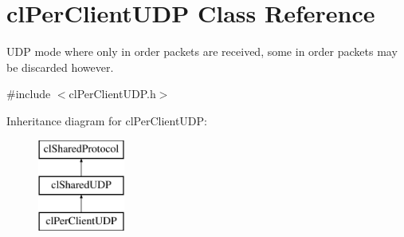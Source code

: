 \hypertarget{classcl_per_client_u_d_p}{
\section{clPerClientUDP Class Reference}
\label{classcl_per_client_u_d_p}
}


UDP mode where only in order packets are received, some in order packets may be discarded however.  




{\ttfamily \#include $<$clPerClientUDP.h$>$}

Inheritance diagram for clPerClientUDP:\begin{figure}[H]
\begin{center}
\leavevmode
\includegraphics[height=3.000000cm]{classcl_per_client_u_d_p}
\end{center}
\end{figure}
